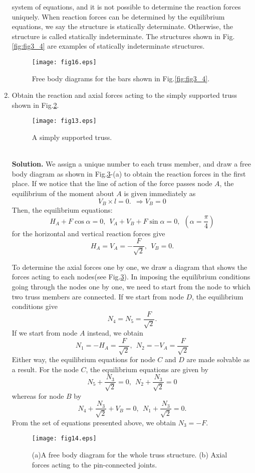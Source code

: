 ﻿\documentclass[10pt,a4j]{article}
\begin{document}
\begin{enumerate}
{	system of equations, and it is not possible to determine the 
	reaction forces uniquely. When reaction forces can be determined by the equilibrium 
	equations, we say the structure is statically determinate. Otherwise, the structure 
	is called statically indeterminate. The structures shown in Fig.\ref{fig:fig3_4} are 
	 examples of statically indeterminate structures.
}
\begin{figure}[h]
	\begin{center}
	\texttt{[image: fig16.eps]} 
	\end{center}
	\caption{Free body diagrams for the bars shown in Fig.\ref{fig:fig3_4}.} 
	\label{fig:fig16}
\end{figure}
\item
	Obtain the reaction and axial forces acting to the simply supported truss 
	shown in Fig.\ref{fig:fig13}.
\begin{figure}[h]
	\begin{center}
	\texttt{[image: fig13.eps]} 
	\end{center}
	\caption{A simply supported truss. } 
	\label{fig:fig13}
\end{figure}
{\small 
	\\
	{\bf Solution.}
	We assign a unique number to each truss member, and draw a free body diagram 
	as shown in Fig.\ref{fig:fig14}-(a) to obtain the reaction forces in the first place. 
	If we notice that the line of action of the force passes node $A$, the equilibrium 
	of the moment about $A$ is given immediately as  
	\[
		V_B\times l =0. \ \ \Rightarrow V_B=0
	\]
	Then, the equilibrium equations: 
	\[ 
		H_A+F\cos\alpha =0 , \ \ V_A+V_B+F\sin\alpha=0, \ \ \left( \alpha=\frac{\pi}{4}\right)
	\]
	for the horizontal and vertical reaction forces give
	\[
		H_A=V_A=-\frac{F}{\sqrt{2}}, \ \ V_B=0.
	\]

	To determine the axial forces one by one, we draw a diagram 
	that shows the forces acting to each nodes(see Fig.\ref{fig:fig14}). 
	In imposing the equilibrium conditions going through the nodes one by one, 
	we need to start from the node to which two truss members are connected.
	If we start from node $D$, the equilibrium conditions give
	\[ 
		N_4=N_5=\frac{F}{\sqrt{2}}.
	\]
	If we start from node $A$ instead, we obtain
	\[
		N_1=-H_A=\frac{F}{\sqrt{2}}, \ \ 
		N_2=-V_A=\frac{F}{\sqrt{2}}
	\]
	Either way, the equilibrium equations for node $C$ and $D$ are made 
	solvable as a result.
	For the node $C$, the equilibrium equations are given by 
	\[
		N_5+\frac{N_3}{\sqrt{2}}=0, \ \ 
		N_2+\frac{N_3}{\sqrt{2}}=0
	\]
	whereas for node $B$ by
	\[
		N_4+\frac{N_3}{\sqrt{2}}+V_B=0, \ \ 
		N_1+\frac{N_3}{\sqrt{2}}=0.
	\]
	From the set of equations presented above, we obtain $N_3=-F$.
}
\begin{figure}[h]
	\begin{center}
	\texttt{[image: fig14.eps]} 
	\end{center}
	\caption{(a)A free body diagram for the whole truss structure.
	(b) Axial forces acting to the pin-connected joints.} 
	\label{fig:fig14}
\end{figure}
\end{enumerate}
\end{document}
